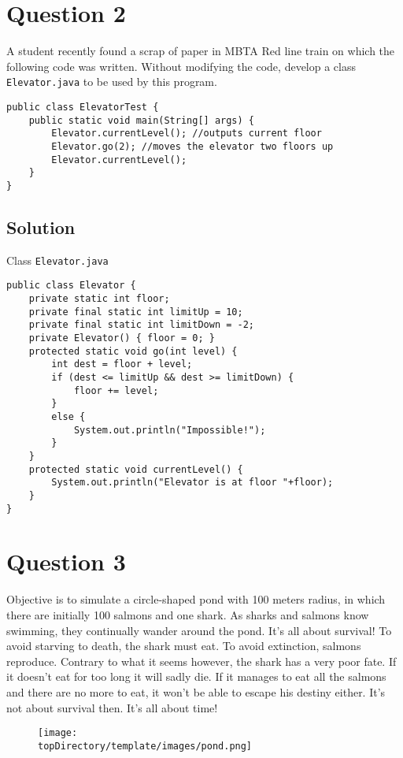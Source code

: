 \section*{Question 2}
A student recently found a scrap of paper in MBTA Red line train on which the following code was written. Without modifying the code, develop a class \texttt{Elevator.java} to be used by this program.
\lstset{language=java,tabsize=2}
\begin{lstlisting}
public class ElevatorTest {
	public static void main(String[] args) {
		Elevator.currentLevel(); //outputs current floor
		Elevator.go(2); //moves the elevator two floors up
		Elevator.currentLevel();
	}
}
\end{lstlisting}

\subsection*{Solution}

Class \texttt{Elevator.java}
\lstset{language=java}
\begin{lstlisting}
public class Elevator {
	private static int floor;
	private final static int limitUp = 10;
	private final static int limitDown = -2;
	private Elevator() { floor = 0; }
	protected static void go(int level) {
		int dest = floor + level;
		if (dest <= limitUp && dest >= limitDown) {
			floor += level;
		}
		else {
			System.out.println("Impossible!");
		}
	}
	protected static void currentLevel() {
		System.out.println("Elevator is at floor "+floor);
	}
}
\end{lstlisting}

\section*{Question 3}

Objective is to simulate a circle-shaped pond with 100 meters radius, in which there are initially 100 salmons and one shark. As sharks and salmons know swimming, they continually wander around the pond. It's all about survival! To avoid starving to death, the shark must eat. To avoid extinction, salmons reproduce. Contrary to what it seems however, the shark has a very poor fate. If it doesn't eat for too long it will sadly die. If it manages to eat all the salmons and there are no more to eat, it won't be able to escape his destiny either. It's not about survival then. It's all about time!
\begin{figure}[H]\centering
\texttt{[image: \\topDirectory/template/images/pond.png]}
\end{figure}

